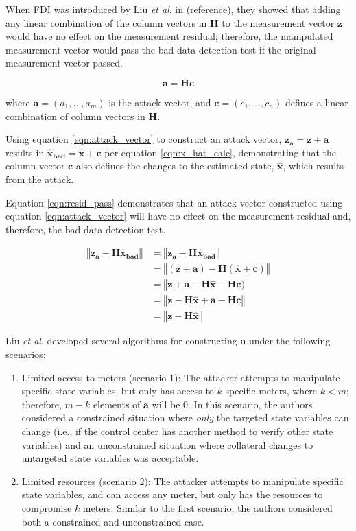 \documentclass{article}
\begin{document}
When FDI was introduced by Liu \textit{et al}. in (reference), they showed that adding any linear combination of the column vectors in $\mathbf{H}$ to the measurement vector $\mathbf{z}$ would have no effect on the measurement residual; therefore, the manipulated measurement vector would pass the bad data detection test if the original measurement vector passed.

\begin{equation} \label{eqn:attack_vector}
    \mathbf{a = Hc}
\end{equation}

where $\mathbf{a} = (a_1, \ldots, a_m)$ is the attack vector,
and $\mathbf{c} = (c_1, \ldots, c_n)$ defines a linear combination of column vectors in $\mathbf{H}$.  

Using equation \eqref{eqn:attack_vector} to construct an attack vector, $\mathbf{z_a=z+a}$ results in $\mathbf{\hat{x}_{bad} = \hat{x} + c}$ per equation \eqref{eqn:x_hat_calc}, demonstrating that the column vector $\mathbf{c}$ also defines the changes to the estimated state, $\mathbf{\hat{x}}$, which results from the attack.

Equation \eqref{eqn:resid_pass} demonstrates that an attack vector constructed using equation \eqref{eqn:attack_vector} will have no effect on the measurement residual and, therefore, the bad data detection test.

\begin{align} \label{eqn:resid_pass}
    \left\Vert \mathbf{z_a-H\hat{x}_{bad}} \right\Vert & = \left\Vert \mathbf{z_a-H\hat{x}_{bad}} \right\Vert \nonumber \\
    & = \left\Vert \mathbf{(z+a)-H(\hat{x}+c)} \right\Vert \nonumber \\
    & = \left\Vert \mathbf{z+a-H\hat{x}-Hc)} \right\Vert \nonumber \\
    & = \left\Vert \mathbf{z-H\hat{x}+a-Hc} \right\Vert \nonumber \\
    & = \left\Vert \mathbf{z-H\hat{x}} \right\Vert
\end{align}

Liu \textit{et al}. developed several algorithms for constructing $\mathbf{a}$ under the following scenarios:
\begin{enumerate}
    \item Limited access to meters (scenario 1):  The attacker attempts to manipulate specific state variables, but only has access to $k$ specific meters, where $k<m$; therefore, $m-k$ elements of $\mathbf{a}$ will be $0$.  In this scenario, the authors considered a constrained situation where \textit{only} the targeted state variables can change (i.e., if the control center has another method to verify other state variables) and an unconstrained situation where collateral changes to untargeted state variables was acceptable.
    \item Limited resources (scenario 2):  The attacker attempts to manipulate specific state variables, and can access any meter, but only has the resources to compromise $k$ meters.  Similar to the first scenario, the authors considered both a constrained and unconstrained case.
\end{enumerate}
\end{document}
